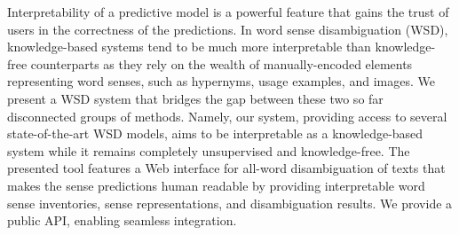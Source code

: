 Interpretability of a predictive model is a powerful feature that gains the trust of users in the correctness of the predictions.  In word sense disambiguation (WSD), knowledge-based systems tend to be much more interpretable than knowledge-free counterparts as they rely on the wealth of manually-encoded elements representing word senses, such as hypernyms, usage examples, and images. We present a WSD system that bridges the gap between these two so far disconnected groups of methods. Namely, our system, providing access to several state-of-the-art WSD models, aims to be interpretable as a knowledge-based system while it remains completely unsupervised and knowledge-free. The presented tool features a Web interface for all-word disambiguation of texts that makes the sense predictions human readable by providing interpretable word sense inventories, sense representations, and disambiguation results. We provide a public API, enabling seamless integration.
